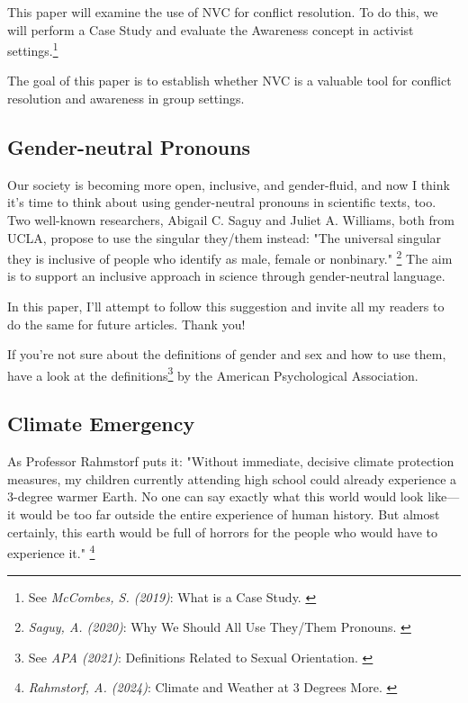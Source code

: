 This paper will examine the use of NVC for conflict resolution. To do this, we will perform a Case Study and evaluate the Awareness concept in activist settings.\footnote{See \textit{McCombes, S. (2019)}: What is a Case Study. \cite{caseScribbr}}

The goal of this paper is to establish whether NVC is a valuable tool for conflict resolution and awareness in group settings.

\subsection{Gender-neutral Pronouns}

Our society is becoming more open, inclusive, and gender-fluid, and now I think it's time to think about using gender-neutral pronouns in scientific texts, too. Two well-known researchers, Abigail C. Saguy and Juliet A. Williams, both from UCLA, propose to use the singular they/them instead: "The universal singular they is inclusive of people who identify as male, female or nonbinary." \footnote{\textit{Saguy, A. (2020)}: Why We Should All Use They/Them Pronouns. \cite{pronouns}} The aim is to support an inclusive approach in science through gender-neutral language. 

In this paper, I'll attempt to follow this suggestion and invite all my readers to do the same for future articles. Thank you!

If you're not sure about the definitions of gender and sex and how to use them, have a look at the definitions\footnote{See \textit{APA (2021)}: Definitions Related to Sexual Orientation. \cite{apaDefinitions}} by the American Psychological Association.

\subsection{Climate Emergency}

As Professor Rahmstorf puts it: "Without immediate, decisive climate protection measures, my children currently attending high school could already experience a 3-degree warmer Earth. No one can say exactly what this world would look like—it would be too far outside the entire experience of human history. But almost certainly, this earth would be full of horrors for the people who would have to experience it." \footnote{\textit{Rahmstorf, A. (2024)}: Climate and Weather at 3 Degrees More. \cite{3dgreesMore}}
